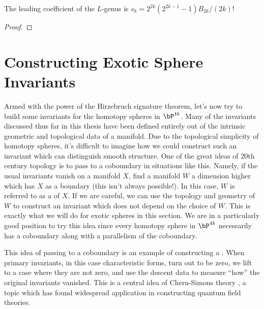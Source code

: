 
\begin{proposition}\label{prop:leading_coefficient_L_genus}
	The leading coefficient of the $L$-genus is $s_k=2^{2k}(2^{2k-1}-1)B_{2k}/(2k)!$
\end{proposition}
\begin{proof}
\end{proof}

\section{Constructing Exotic Sphere Invariants}\label{sec:constructing-exotic-sphere-invariants}

Armed with the power of the Hirzebruch signature theorem, let's now try to build some invariants for the homotopy spheres in $\bP^{4k}$.
Many of the invariants discussed thus far in this thesis have been defined entirely out of the intrinsic geometric and topological data of a manifold. 
Due to the topological simplicity of homotopy spheres, it's difficult to imagine how we could construct such an invariant which can distinguish smooth structure. One of the great ideas of 20th century topology is to pass to a coboundary in situations like this. Namely, if the usual invariants vanish on a manifold $X$, find a manifold $W$ a dimension higher which has $X$ as a boundary (this isn't always possible!). In this case, $W$ is referred to as a  of $X$. If we are careful, we can use the topology and geometry of $W$ to construct an invariant which does not depend on the choice of $W$. This is exactly what we will do for exotic spheres in this section. We are in a particularly good position to try this idea since every homotopy sphere in $\bP^{4k}$ necessarily has a coboundary along with a parallelism of the coboundary.

\begin{remark}
	This idea of passing to a coboundary is an example of constructing a . When primary invariants, in this case characteristic forms, turn out to be zero, we lift to a case where they are not zero, and use the descent data to measure ``how'' the original invariants vanished. This is a central idea of Chern-Simons theory \cite{chernsimons1974geometricinvariants}, a topic which has found widespread application in constructing quantum field theories. 
\end{remark}

